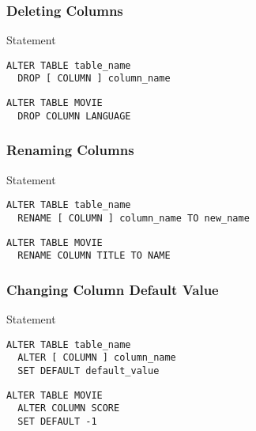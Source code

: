 \documentclass[dvipsnames]{beamer}
\theoremstyle{plain}
\begin{document}
\begin{frame}[fragile]
  \frametitle{Deleting Columns}

  \begin{block}{Statement}
    \begin{lstlisting}
ALTER TABLE table_name
  DROP [ COLUMN ] column_name
    \end{lstlisting}
  \end{block}

  \pause
  \begin{example}
    \begin{lstlisting}
ALTER TABLE MOVIE
  DROP COLUMN LANGUAGE
    \end{lstlisting}
  \end{example}
\end{frame}

\begin{frame}[fragile]
  \frametitle{Renaming Columns}

  \begin{block}{Statement}
    \begin{lstlisting}
ALTER TABLE table_name
  RENAME [ COLUMN ] column_name TO new_name
    \end{lstlisting}
  \end{block}

  \pause
  \begin{example}
    \begin{lstlisting}
ALTER TABLE MOVIE
  RENAME COLUMN TITLE TO NAME
    \end{lstlisting}
  \end{example}
\end{frame}

\begin{frame}[fragile]
  \frametitle{Changing Column Default Value}

  \begin{block}{Statement}
    \begin{lstlisting}
ALTER TABLE table_name
  ALTER [ COLUMN ] column_name
  SET DEFAULT default_value
    \end{lstlisting}
  \end{block}

  \pause
  \begin{example}
    \begin{lstlisting}
ALTER TABLE MOVIE
  ALTER COLUMN SCORE
  SET DEFAULT -1
    \end{lstlisting}
  \end{example}
\end{frame}
\end{document}
